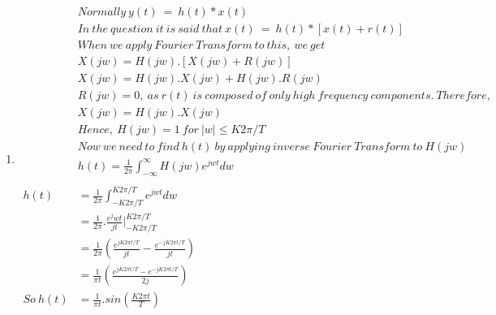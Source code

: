 \documentclass[10pt,a4paper, margin=1in]{article}
\begin{document}
\begin{enumerate}
\item %
\begin{align*}
&Normally \ y(t) \ = \ h(t) \ast x(t) \\
&In \ the \ question \ it \ is \ said \ that \ x(t) \ = \ h(t) \ast [x(t) + r(t)] \\
&When \ we \ apply \ Fourier \ Transform \ to \ this, \ we \ get \\ 
&X(jw) = H(jw).[X(jw) + R(jw)] \\
&X(jw) = H(jw).X(jw) + H(jw).R(jw) \\
&R(jw) = 0, \ as \ r(t) \ is \ composed \ of \ only \ high \ frequency \ components. \ Therefore, \\
&X(jw) = H(jw).X(jw) \\
&Hence, \ H(jw) = 1 \ for \ |w| \leq K2\pi/T \\
&Now \ we \ need \ to \ find \ h(t) \ by \ applying \ inverse \ Fourier \ Transform \ to \ H(jw) \\
&h(t) = \frac{1}{2\pi} \int_{-\infty}^{\infty} H(jw)e^{jwt}dw \\ \\
h(t) &= \frac{1}{2\pi} \int_{-K2\pi/T}^{K2\pi/T}e^{jwt}dw \\
&=\frac{1}{2\pi}.\frac{e^jwt}{jt}\vert_{-K2\pi/T}^{K2\pi/T} \\
&=\frac{1}{2\pi}(\frac{e^{jK2 \pi t/T}}{jt} - \frac{e^{-jK2\pi t/T}}{jt}) \\
&=\frac{1}{\pi t}(\frac{e^{jK2 \pi t/T} - e^{-jK2\pi t/T}}{2j}) \\
So \ h(t) &= \frac{1}{\pi t}.sin(\frac{K2\pi t}{T}) \\
\end{align*}


\end{enumerate}
\end{document}
